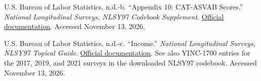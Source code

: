 \documentclass[12pt,letterpaper]{article}
\begin{document}
\begin{list}{}{\setlength{\leftmargin}{0.3in}
              \setlength{\itemindent}{-0.3in}
              \setlength{\itemsep}{0.6\baselineskip}
              \setlength{\parsep}{0pt}}
\item U.S. Bureau of Labor Statistics. n.d.-b. ``Appendix 10: CAT-ASVAB Scores.'' \textit{National Longitudinal Surveys, NLSY97 Codebook Supplement}. \href{https://nlsinfo.org/content/cohorts/nlsy97/other-documentation/codebook-supplement/appendix-10-cat-asvab-scores}{Official documentation}. Accessed November 13, 2026.
\item U.S. Bureau of Labor Statistics. n.d.-c. ``Income.'' \textit{National Longitudinal Surveys, NLSY97 Topical Guide}. \href{https://nlsinfo.org/content/cohorts/nlsy97/topical-guide/income/income}{Official documentation}. See also YINC-1700 entries for the 2017, 2019, and 2021 surveys in the downloaded NLSY97 codebook. Accessed November 13, 2026.
\end{list}
\end{document}
